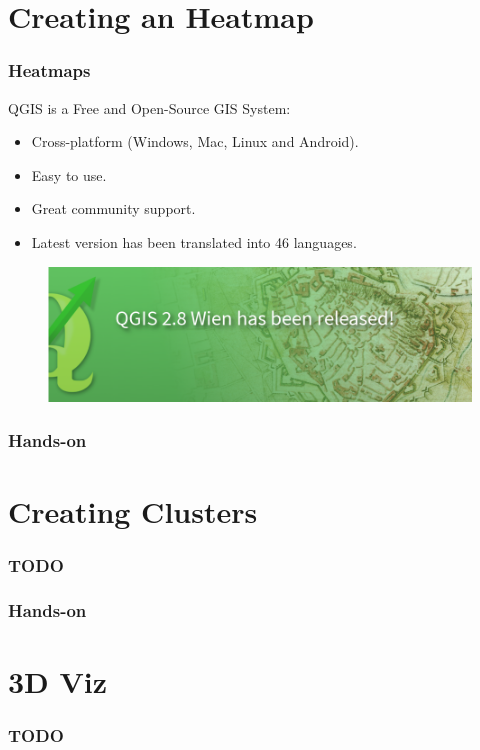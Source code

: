 \documentclass[hyperref={pdfpagelabels=true}]{beamer}
\begin{document}
\section{Creating an Heatmap} 
\begin{frame}
\frametitle{Heatmaps}
QGIS is a Free and Open-Source GIS System:
    \begin{itemize}
      \item<2->Cross-platform (Windows, Mac, Linux and Android).
      \item<3->Easy to use.
      \item<4->Great community support.
      \item<5->Latest version has been translated into 46 languages.
      \end{itemize}
      
    \begin{figure}  
      \includegraphics[width=\textwidth]{qgis.png}\\
      \end{figure}  
       
\end{frame}


\begin{frame}
\frametitle{Hands-on}


\end{frame}

\section{Creating Clusters} 
\begin{frame}
\frametitle{TODO}


\end{frame}

\begin{frame}
\frametitle{Hands-on}


\end{frame}

\section{3D Viz} 
\begin{frame}
\frametitle{TODO}


\end{frame}
\end{document}
